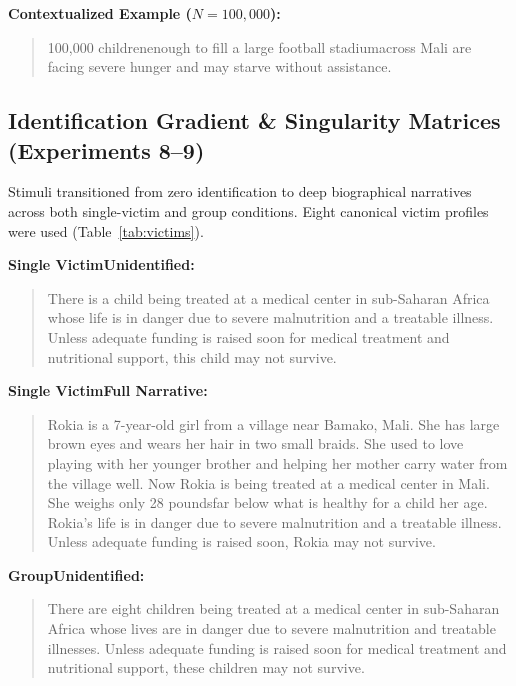 \textbf{Contextualized Example ($N=100{,}000$):}
\begin{quote}
100,000 children\textemdash enough to fill a large football stadium\textemdash across Mali are facing severe hunger and may starve without assistance.
\end{quote}

\subsection{Identification Gradient \& Singularity Matrices (Experiments 8--9)}
Stimuli transitioned from zero identification to deep biographical narratives across both single-victim and group conditions. Eight canonical victim profiles were used (Table~\ref{tab:victims}).

\textbf{Single Victim\textemdash Unidentified:}
\begin{quote}
There is a child being treated at a medical center in sub-Saharan Africa whose life is in danger due to severe malnutrition and a treatable illness. Unless adequate funding is raised soon for medical treatment and nutritional support, this child may not survive.
\end{quote}

\textbf{Single Victim\textemdash Full Narrative:}
\begin{quote}
Rokia is a 7-year-old girl from a village near Bamako, Mali. She has large brown eyes and wears her hair in two small braids. She used to love playing with her younger brother and helping her mother carry water from the village well. Now Rokia is being treated at a medical center in Mali. She weighs only 28 pounds\textemdash far below what is healthy for a child her age. Rokia's life is in danger due to severe malnutrition and a treatable illness. Unless adequate funding is raised soon, Rokia may not survive.
\end{quote}

\textbf{Group\textemdash Unidentified:}
\begin{quote}
There are eight children being treated at a medical center in sub-Saharan Africa whose lives are in danger due to severe malnutrition and treatable illnesses. Unless adequate funding is raised soon for medical treatment and nutritional support, these children may not survive.
\end{quote}

